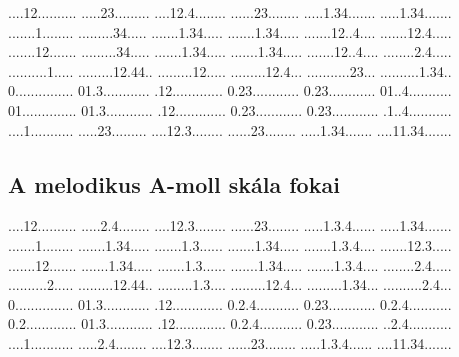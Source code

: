 \documentclass[a4paper,11pt]{article}
\begin{document}
          {....12..........%
           .....23.........%
           ....12.4........%
           ......23........%
           .....1.34.......%
           .....1.34.......} 
          {.......1........%
           .........34.....%
           .......1.34.....%
           .......1.34.....%
           .......12..4....%
           .......12.4.....}
          {.......12.......%
           .........34.....%
           .......1.34.....%
           .......1.34.....%
           .......12..4....%
           ........2.4.....}
          {..........1.....%
           .........12.44..%
           .........12.....%
           .........12.4...%
           ...........23...%
           ..........1.34..}
          {0...............%
           01.3............%
           .12.............%
           0.23............%
           0.23............%
           01..4...........}
          {01..............%
           01.3............%
           .12.............%
           0.23............%
           0.23............%
           .1..4...........}
          {....1...........%
           .....23.........%
           ....12.3........%
           ......23........%
           .....1.34.......%
           ....11.34.......}
\newpage

\subsection{A melodikus A-moll skála fokai}

          {....12..........%
           .....2.4........%
           ....12.3........%
           ......23........%
           .....1.3.4......%
           .....1.34.......}
          {.......1........%
           .......1.34.....%
           .......1.3......%
           .......1.34.....%
           .......1.3.4....%
           .......12.3.....}
          {.......12.......%
           .......1.34.....%
           .......1.3......%
           .......1.34.....%
           .......1.3.4....%
           ........2.4.....}
          {..........2.....%
           .........12.44..%
           .........1.3....%
           .........12.4...%
           .........1.34...%
           ..........2.4...}
          {0...............%
           01.3............%
           .12.............%
           0.2.4...........%
           0.23............%
           0.2.4...........}
          {0.2.............%
           01.3............%
           .12.............%
           0.2.4...........%
           0.23............%
           ..2.4...........}
          {....1...........%
           .....2.4........%
           ....12.3........%
           ......23........%
           .....1.3.4......%
           ....11.34.......}
\newpage
\end{document}
